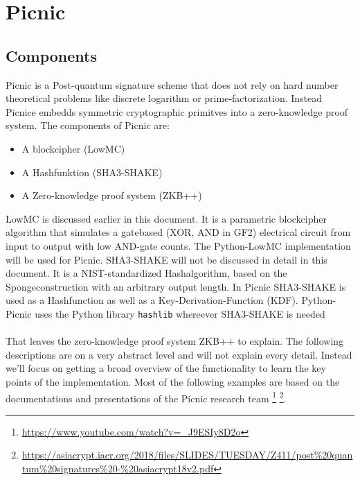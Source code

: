 \documentclass[]{article}
\begin{document}
\section{Picnic}
\subsection{Components}
Picnic is a Post-quantum signature scheme that does not rely on hard number theoretical problems like discrete logarithm or prime-factorization. Instead Picnice embedds symmetric cryptographic primitves into a zero-knowledge proof system. The components of Picnic are:
\begin{itemize}
\item{A blockcipher (LowMC)}
\item{A Hashfunktion (SHA3-SHAKE)}
\item{A Zero-knowledge proof system (ZKB++)}
\end{itemize}
LowMC is discussed earlier in this document. It is a parametric blockcipher algorithm that simulates a gatebased (XOR, AND in GF2) electrical circuit from input to output with low AND-gate counts. The Python-LowMC implementation will be used for Picnic. SHA3-SHAKE will not be discussed in detail in this document. It is a NIST-standardized Hashalgorithm, based on the Spongeconstruction with an arbitrary output length. In Picnic SHA3-SHAKE is used as a Hashfunction as well as a Key-Derivation-Function (KDF). Python-Picnic uses the Python library \texttt{hashlib} whereever SHA3-SHAKE is needed\\ \\
That leaves the zero-knowledge proof system ZKB++ to explain. The following descriptions are on a very abstract level and will not explain every detail. Instead we'll focus on getting a broad overview of the functionality to learn the key points of the implementation. Most of the following examples are based on the documentations and presentations of the Picnic research team  \footnote{\url{https://www.youtube.com/watch?v=_J9ESIy8D2o}} \footnote{\url{https://asiacrypt.iacr.org/2018/files/SLIDES/TUESDAY/Z411/post\%20quantum\%20signatures\%20-\%20asiacrypt18v2.pdf}}.
\end{document}

